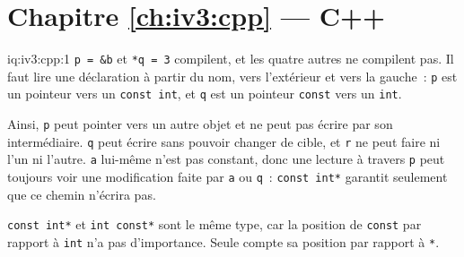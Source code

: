 \section*{Chapitre \ref{ch:iv3:cpp} --- C++}

\begin{solution}{iq:iv3:cpp:1}
\texttt{p = \&b} et \texttt{*q = 3} compilent, et les quatre autres ne compilent pas. Il faut lire une déclaration à partir du nom, vers l'extérieur et vers la gauche~: \texttt{p} est un pointeur vers un \texttt{const int}, et \texttt{q} est un pointeur \texttt{const} vers un \texttt{int}.

Ainsi, \texttt{p} peut pointer vers un autre objet et ne peut pas écrire par son intermédiaire. \texttt{q} peut écrire sans pouvoir changer de cible, et \texttt{r} ne peut faire ni l'un ni l'autre. \texttt{a} lui-même n'est pas constant, donc une lecture à travers \texttt{p} peut toujours voir une modification faite par \texttt{a} ou \texttt{q}~: \texttt{const int*} garantit seulement que ce chemin n'écrira pas.

\texttt{const int*} et \texttt{int const*} sont le même type, car la position de \texttt{const} par rapport à \texttt{int} n'a pas d'importance. Seule compte sa position par rapport à \texttt{*}.

\end{solution}

